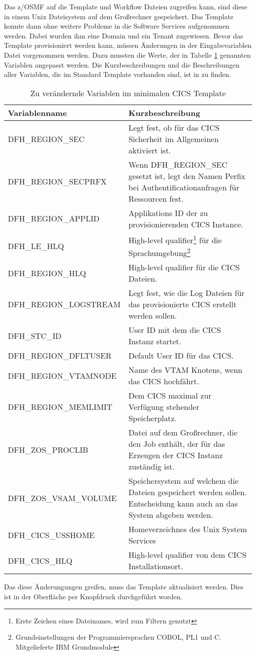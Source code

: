 Das z/OSMF auf die Template und Workflow Dateien zugreifen kann, sind diese in einem Unix Dateisystem auf dem Großrechner gespeichert.
Das Template konnte dann ohne weitere Probleme in die Software Services aufgenommen werden.
Dabei wurden ihm eine Domain und ein Tenant zugewiesen.
Bevor das Template provisioniert werden kann, müssen Änderungen in der Eingabevariablen Datei vorgenommen werden.
Dazu mussten die Werte, der in Tabelle \ref{tab:cgsvars} genannten Variablen angepasst werden.
Die Kurzbeschreibungen und die Beschreibungen aller Variablen, die im Standard Template vorhanden sind, ist in \cite{IBM.2019} zu finden.
\begin{table}
\centering
\begin{tabularx}{\textwidth}{X|X}
Variablenname & Kurzbeschreibung \\
\hline
DFH\_REGION\_SEC & Legt fest, ob für das CICS Sicherheit im Allgemeinen aktiviert ist. \\
\hline
DFH\_REGION\_SECPRFX & Wenn DFH\_REGION\_SEC gesetzt ist, legt den Namen Perfix bei Authentificationanfragen für Ressourcen fest. \\
\hline
DFH\_REGION\_APPLID & Applikations ID der zu provisionierenden CICS Instance. \\
\hline
DFH\_LE\_HLQ & High-level qualifier\footnote{Erste Zeichen eines Dateinames, wird zum Filtern genutzt} für die Sprachumgebung\footnote{Grundeinstellungen der Programmiersprachen COBOL, PL1 und C. Mitgelieferte IBM Grundmodule} \\
\hline
DFH\_REGION\_HLQ & High-level qualifier für die CICS Dateien.\\
\hline
DFH\_REGION\_LOGSTREAM & Legt fest, wie die Log Dateien für das provisionierte CICS erstellt werden sollen. \\
\hline
DFH\_STC\_ID & User ID mit dem die CICS Instanz startet. \\
\hline
DFH\_REGION\_DFLTUSER & Default User ID für das CICS. \\
\hline
DFH\_REGION\_VTAMNODE & Name des VTAM Knotens, wenn das CICS hochfährt. \\
\hline
DFH\_REGION\_MEMLIMIT & Dem CICS maximal zur Verfügung stehender Speicherplatz. \\
\hline
DFH\_ZOS\_PROCLIB & Datei auf dem Großrechner, die den Job enthält, der für das Erzeugen der CICS Instanz zuständig ist. \\
\hline
DFH\_ZOS\_VSAM\_VOLUME & Speichersystem auf welchem die Dateien gespeichert werden sollen. Entscheidung kann auch an das System abgeben werden. \\
\hline
DFH\_CICS\_USSHOME & Homeverzeichnes des Unix System Services \\
\hline
DFH\_CICS\_HLQ & High-level qualifier von dem CICS Installationsort. \\
\end{tabularx}
\caption{Zu verändernde Variablen im minimalen CICS Template}
\label{tab:cgsvars}
\end{table}
Das diese Änderungungen greifen, muss das Template aktualisiert werden.
Dies ist in der Oberfläche per Knopfdruck durchgeführt worden.

